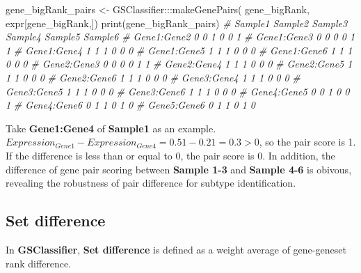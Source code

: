 \documentclass[
  12pt,
]{book}
\newenvironment{Shaded}{\begin{snugshade}}{\end{snugshade}}
\newcommand{\CommentTok}[1]{\textcolor[rgb]{0.56,0.35,0.01}{\textit{#1}}}
\newcommand{\FunctionTok}[1]{\textcolor[rgb]{0.00,0.00,0.00}{#1}}
\newcommand{\NormalTok}[1]{#1}
\newcommand{\OtherTok}[1]{\textcolor[rgb]{0.56,0.35,0.01}{#1}}
\newcommand{\SpecialCharTok}[1]{\textcolor[rgb]{0.00,0.00,0.00}{#1}}
\begin{document}
\begin{Shaded}
\begin{Highlighting}[]
\NormalTok{gene\_bigRank\_pairs }\OtherTok{\textless{}{-}}\NormalTok{ GSClassifier}\SpecialCharTok{:::}\FunctionTok{makeGenePairs}\NormalTok{(}
\NormalTok{  gene\_bigRank, }
\NormalTok{  expr[gene\_bigRank,])}
\FunctionTok{print}\NormalTok{(gene\_bigRank\_pairs)}
\CommentTok{\#             Sample1 Sample2 Sample3 Sample4 Sample5 Sample6}
\CommentTok{\# Gene1:Gene2       0       0       1       0       0       1}
\CommentTok{\# Gene1:Gene3       0       0       0       0       1       1}
\CommentTok{\# Gene1:Gene4       1       1       1       0       0       0}
\CommentTok{\# Gene1:Gene5       1       1       1       0       0       0}
\CommentTok{\# Gene1:Gene6       1       1       1       0       0       0}
\CommentTok{\# Gene2:Gene3       0       0       0       0       1       1}
\CommentTok{\# Gene2:Gene4       1       1       1       0       0       0}
\CommentTok{\# Gene2:Gene5       1       1       1       0       0       0}
\CommentTok{\# Gene2:Gene6       1       1       1       0       0       0}
\CommentTok{\# Gene3:Gene4       1       1       1       0       0       0}
\CommentTok{\# Gene3:Gene5       1       1       1       0       0       0}
\CommentTok{\# Gene3:Gene6       1       1       1       0       0       0}
\CommentTok{\# Gene4:Gene5       0       0       1       0       0       1}
\CommentTok{\# Gene4:Gene6       0       1       1       0       1       0}
\CommentTok{\# Gene5:Gene6       0       1       1       0       1       0}
\end{Highlighting}
\end{Shaded}

Take \textbf{Gene1:Gene4} of \textbf{Sample1} as an example. \(Expression_{Gene1} - Expression_{Gene4} = 0.51-0.21 = 0.3 > 0\), so the pair score is 1. If the difference is less than or equal to 0, the pair score is 0. In addition, the difference of gene pair scoring between \textbf{Sample 1-3} and \textbf{Sample 4-6} is obivous, revealing the robustness of pair difference for subtype identification.

\hypertarget{set-difference}{%
\subsection{Set difference}\label{set-difference}}

In \textbf{GSClassifier}, \textbf{Set difference} is defined as a weight average of gene-geneset rank difference.
\end{document}
